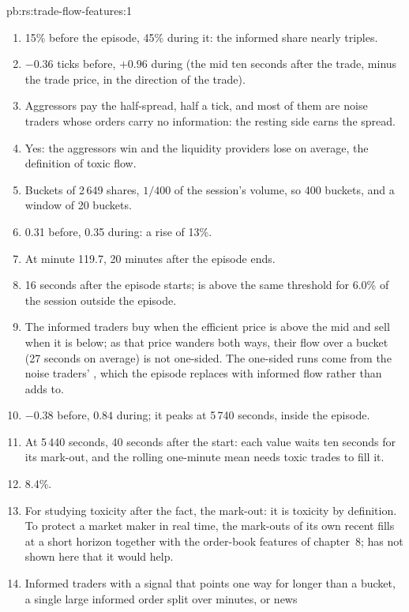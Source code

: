 \begin{solution}{pb:rs:trade-flow-features:1}
\begin{enumerate}
\item 15\% before the episode, 45\% during it: the informed share nearly triples.
\item $-0.36$ ticks before, $+0.96$ during (the mid ten seconds after the trade, minus the trade price, in the direction of the trade).
\item Aggressors pay the half-spread, half a tick, and most of them are noise traders whose orders carry no information: the resting side
earns the spread.
\item Yes: the aggressors win and the liquidity providers lose on average, the definition of toxic flow.
\item Buckets of 2\,649 shares, $1/400$ of the session's volume, so 400 buckets, and a window of 20 buckets.
\item 0.31 before, 0.35 during: a rise of 13\%.
\item At minute 119.7, 20 minutes after the episode ends.
\item 16 seconds after the episode starts;  is above the same threshold for 6.0\% of the session outside the episode.
\item The informed traders buy when the efficient price is above the mid and sell when it is below; as that price wanders both ways, their flow
over a bucket (27 seconds on average) is not one-sided. The one-sided runs come from the noise traders' , which the episode replaces
with informed flow rather than adds to.
\item $-0.38$ before, $0.84$ during; it peaks at 5\,740 seconds, inside the episode.
\item At 5\,440 seconds, 40 seconds after the start: each value waits ten seconds for its mark-out, and the rolling one-minute mean needs
toxic trades to fill it.
\item 8.4\%.
\item For studying toxicity after the fact, the mark-out: it is toxicity by definition. To protect a market maker in real time, the mark-outs
of its own recent fills at a short horizon together with the order-book features of chapter~8;  has not shown here that it would help.
\item Informed traders with a signal that points one way for longer than a bucket, a single large informed order split over minutes, or news

\end{enumerate}
\end{solution}
